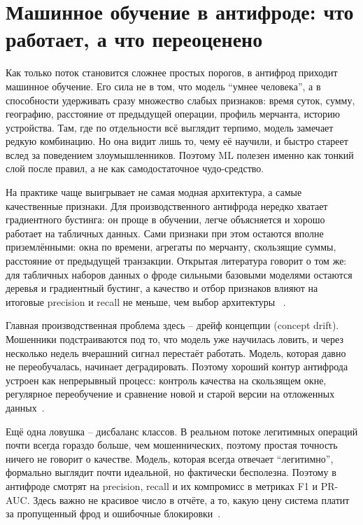 \section{Машинное обучение в антифроде: что работает, а что переоценено}
\label{sec:fraud-ml}

Как только поток становится сложнее простых порогов, в антифрод
приходит машинное обучение. Его сила не в том, что модель
\enquote{умнее человека}, а в способности удерживать сразу множество
слабых признаков: время суток, сумму, географию, расстояние от
предыдущей операции, профиль мерчанта, историю устройства. Там, где
по отдельности всё выглядит терпимо, модель замечает редкую
комбинацию. Но она видит лишь то, чему её научили, и быстро стареет
вслед за поведением злоумышленников. Поэтому ML полезен именно как
тонкий слой после правил, а не как самодостаточное чудо-средство.

На практике чаще выигрывает не самая модная архитектура, а самые
качественные признаки. Для производственного антифрода нередко
хватает градиентного бустинга: он проще в обучении, легче
объясняется и хорошо работает на табличных данных. Сами признаки при
этом остаются вполне приземлёнными: окна по времени, агрегаты по
мерчанту, скользящие суммы, расстояние от предыдущей транзакции.
Открытая литература говорит о том же: для табличных наборов данных о
фроде сильными базовыми моделями остаются деревья и градиентный
бустинг, а качество и отбор признаков влияют на итоговые precision и
recall не меньше, чем выбор архитектуры
~\cite{fraud-feature-selection-2024}\cite{fraud-lightgbm-2024}.

Главная производственная проблема здесь -- дрейф концепции (concept
drift). Мошенники подстраиваются под то, что модель уже научилась
ловить, и через несколько недель вчерашний сигнал перестаёт
работать. Модель, которая давно не переобучалась, начинает
деградировать. Поэтому хороший контур антифрода устроен как
непрерывный процесс: контроль качества на скользящем окне,
регулярное переобучение и сравнение новой и старой версии на
отложенных данных~\cite{concept-drift-survey-2014}.

Ещё одна ловушка -- дисбаланс классов. В реальном потоке
легитимных операций почти всегда гораздо больше, чем мошеннических,
поэтому простая точность ничего не говорит о качестве. Модель,
которая всегда отвечает \enquote{легитимно}, формально выглядит почти
идеальной, но фактически бесполезна. Поэтому в антифроде смотрят на
precision, recall и их компромисс в метриках F1 и PR-AUC. Здесь
важно не красивое число в отчёте, а то, какую цену система платит за
пропущенный фрод и ошибочные блокировки~\cite{roc-pr-imbalanced-2024}.

